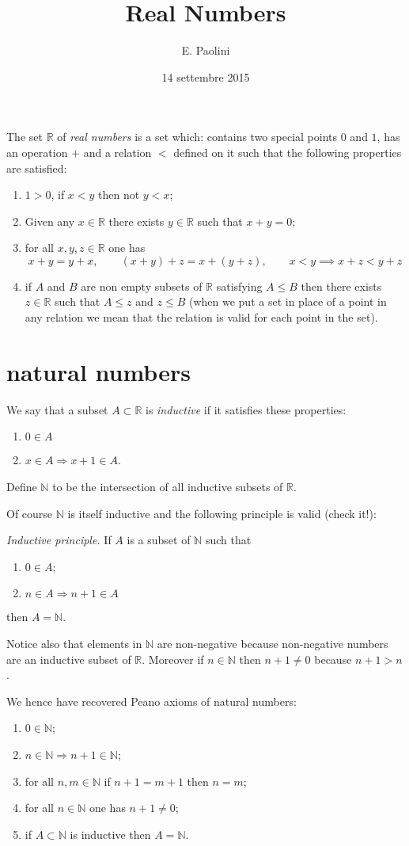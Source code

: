 \documentclass[italian,a4paper]{scrartcl}
\title{Real Numbers}
\author{E. Paolini}
\date{14 settembre 2015}
\newcommand{\RR}{{\mathbb R}}
\newcommand{\NN}{{\mathbb N}}
\begin{document}
\maketitle

The set $\RR$ of \emph{real numbers} is a set which: contains two special points
$0$ and $1$, has an operation $+$ and a relation $<$ defined on it
such that the following properties are satisfied:

\begin{enumerate}
\item
$1>0$, if $x<y$ then not $y<x$;
\item
Given any $x\in \RR$ there exists $y\in \RR$ such that $x+y=0$;
\item
for all $x,y,z\in \RR$ one has
\[
 x+y = y+x, \qquad
 (x+y)+z = x+(y+z), \qquad
 x < y \implies  x+z < y+z
\]
\item
if $A$ and $B$ are non empty subsets of $\RR$ satisfying $A\le B$ then there exists
$z\in \RR$ such that $A \le z$ and $z \le B$
(when we put a set in place of a point in any relation we mean that the relation
is valid for each point in the set).
\end{enumerate}

\section{natural numbers}

We say that a subset $A\subset \RR$ is \emph{inductive} if it satisfies these properties:
\begin{enumerate}
\item $0\in A$
\item $x\in A \Rightarrow x+1 \in A$.
\end{enumerate}
Define $\NN$ to be the intersection of all inductive subsets of $\RR$.

Of course $\NN$ is itself inductive and the following principle is valid
(check it!):

\emph{Inductive principle.} If $A$ is a subset of $\NN$ such that
\begin{enumerate}
\item $0\in A$;
\item $n\in A \Rightarrow n+1 \in A$
\end{enumerate}
then $A=\NN$.

Notice also that elements in $\NN$ are non-negative because non-negative numbers
are an inductive subset of $\RR$. Moreover if $n\in \NN$ then
$n+1 \neq 0$ because $n+1 > n$.

We hence have recovered Peano axioms of natural numbers:
\begin{enumerate}
\item $0 \in \NN$;
\item $n \in \NN \Rightarrow n+1 \in \NN$;
\item for all $n,m \in \NN$ if $n+1 = m+1$ then $n=m$;
\item for all $n\in \NN$ one has $n+1 \neq 0$;
\item if $A\subset \NN$ is inductive then $A= \NN$.
\end{enumerate}
\end{document}
